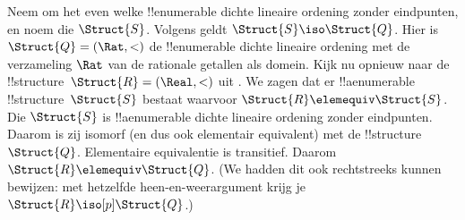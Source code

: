 \documentclass[openany]{memoir}
\begin{document}
\begin{rem}
  Neem om het even welke !!{enumerable} dichte lineaire ordening zonder
  eindpunten, en noem die $\Struct{S}$. Volgens  geldt
  $\Struct{S} \iso \Struct{Q}$. Hier is
  $\Struct{Q} = (\Rat, <)$ de !!{enumerable} dichte lineaire ordening met
  de verzameling $\Rat$ van de rationale getallen als domein. Kijk nu opnieuw
  naar de !!{structure}~$\Struct{R} = (\Real, <)$ uit
  . We zagen dat er !!a{enumerable}
  !!{structure}~$\Struct{S}$ bestaat waarvoor $\Struct{R} \elemequiv
  \Struct{S}$. Die $\Struct{S}$ is !!a{enumerable} dichte lineaire ordening
  zonder eindpunten. Daarom is zij isomorf (en dus ook elementair equivalent)
  met de !!{structure}~$\Struct{Q}$. Elementaire equivalentie
  is transitief. Daarom $\Struct{R} \elemequiv \Struct{Q}$. (We hadden dit
  ook rechtstreeks kunnen bewijzen: met hetzelfde heen-en-weerargument krijg
  je $\Struct{R} \iso[p] \Struct{Q}$.)
\end{rem}
\endgroup
\OLEndChapterHook

\begingroup
\def\olfilename{OLP-0191}
\def\olfilepath{content/model-theory/models-of-arithmetic/}
\hypertarget{unit-OLP-0191}{}



\endgroup

\begingroup
\def\olfilename{OLP-0192}
\def\olfilepath{content/model-theory/models-of-arithmetic/}
\hypertarget{unit-OLP-0192}{}
\end{document}
